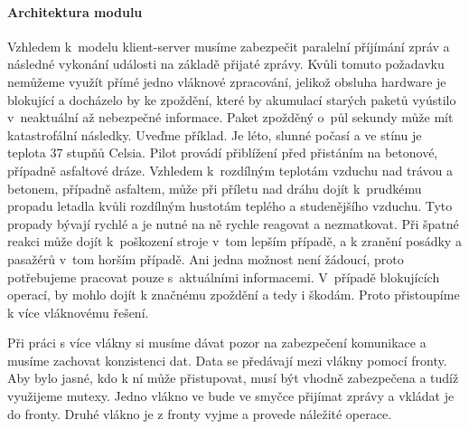 		\paragraph{Architektura modulu}
		Vzhledem k~modelu klient-server musíme zabezpečit paralelní příjímání zpráv a následné vykonání události na základě přijaté zprávy. Kvůli tomuto požadavku nemůžeme využít přímé jedno vláknové zpracování, jelikož obsluha hardware je blokující a docházelo by ke zpoždění, které by akumulací starých paketů vyústilo v~neaktuální až nebezpečné informace. Paket zpožděný o~půl sekundy může mít katastrofální následky. Uveďme příklad. Je léto, slunné počasí a ve stínu je teplota 37 stupňů Celsia. Pilot provádí přiblížení před přistáním na betonové, případně asfaltové dráze. Vzhledem k~rozdílným teplotám vzduchu nad trávou a betonem, případně asfaltem, může při příletu nad dráhu dojít k~prudkému propadu letadla kvůli rozdílným hustotám teplého a studenějšího vzduchu. Tyto propady bývají rychlé a je nutné na ně rychle reagovat a nezmatkovat. Při špatné reakci může dojít k~poškození stroje v~tom lepším případě, a k zranění posádky a pasažérů v~tom horším případě. Ani jedna možnost není žádoucí, proto potřebujeme pracovat pouze s~aktuálními informacemi. V~případě blokujících operací, by mohlo dojít k značnému zpoždění a tedy i škodám. Proto přistoupíme k více vláknovému řešení.\par
		Při práci s více vlákny si musíme dávat pozor na zabezpečení komunikace a musíme zachovat konzistenci dat. Data se předávají mezi vlákny pomocí fronty. Aby bylo jasné, kdo k ní může přistupovat, musí být vhodně zabezpečena a tudíž využijeme mutexy. Jedno vlákno ve bude ve smyčce přijímat zprávy a vkládat je do fronty. Druhé vlákno je z fronty vyjme a provede náležité operace.\par
		
